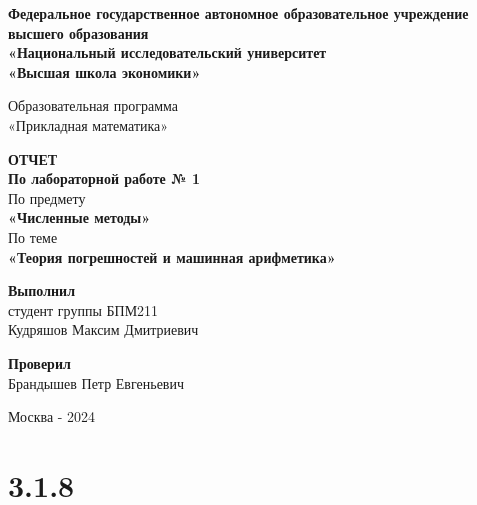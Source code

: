 \documentclass[a4paper,11pt]{article}
\theoremstyle{definition} %
\theoremstyle{remark} %
\begin{document}
\begin{titlepage} %
\pagestyle{empty}
\begin{center}

\Large
\textbf{Федеральное государственное автономное образовательное учреждение высшего образования\\
«Национальный исследовательский университет\\
«Высшая школа экономики»}\\
\vspace{5mm}

\Large
Образовательная программа \\
«Прикладная математика»
\vspace{40mm}

\Large
\textbf{ОТЧЕТ} \\
\textbf{По лабораторной работе № 1} \\
\vspace{5mm}
\Large По предмету \\
\LARGE\textbf{«Численные методы»} \\
\vspace{5mm}
\Large По теме \\
\LARGE\textbf{«Теория погрешностей и машинная арифметика»}
\end{center}

\begin{center}
\vfill

\large
\begin{flushright}
\textbf{Выполнил} \\
студент группы БПМ211 \\
Кудряшов Максим Дмитриевич \\
\end{flushright}

\large
\begin{flushright}
\textbf{Проверил} \\
Брандышев Петр Евгеньевич \\
\end{flushright}

\large
\vspace{20mm}
Москва - 2024
\end{center}
\end{titlepage} %

\newpage
\tableofcontents
\newpage

\section{3.1.8}
\end{document}
